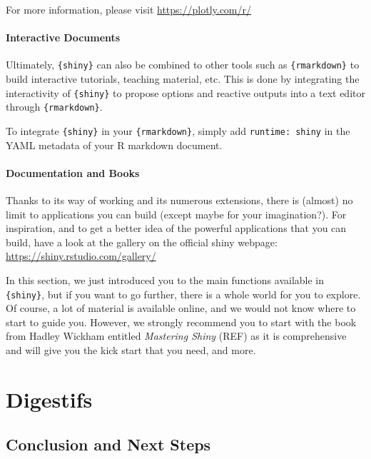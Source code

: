 \documentclass[
]{book}
\begin{document}
For more information, please visit \url{https://plotly.com/r/}

\hypertarget{interactive-documents}{%
\subsection{Interactive Documents}\label{interactive-documents}}

Ultimately, \texttt{\{shiny\}} can also be combined to other tools such as \texttt{\{rmarkdown\}} to build interactive tutorials, teaching material, etc. This is done by integrating the interactivity of \texttt{\{shiny\}} to propose options and reactive outputs into a text editor through \texttt{\{rmarkdown\}}.

To integrate \texttt{\{shiny\}} in your \texttt{\{rmarkdown\}}, simply add \texttt{runtime:\ shiny} in the YAML metadata of your R markdown document.

\hypertarget{documentation-and-books}{%
\subsection{Documentation and Books}\label{documentation-and-books}}

Thanks to its way of working and its numerous extensions, there is (almost) no limit to applications you can build (except maybe for your imagination?). For inspiration, and to get a better idea of the powerful applications that you can build, have a look at the gallery on the official shiny webpage:
\url{https://shiny.rstudio.com/gallery/}

In this section, we just introduced you to the main functions available in \texttt{\{shiny\}}, but if you want to go further, there is a whole world for you to explore. Of course, a lot of material is available online, and we would not know where to start to guide you. However, we strongly recommend you to start with the book from Hadley Wickham entitled \emph{Mastering Shiny} (REF) as it is comprehensive and will give you the kick start that you need, and more.

\hypertarget{part-digestifs}{%
\part*{Digestifs}\label{part-digestifs}}

\hypertarget{next-steps}{%
\chapter{Conclusion and Next Steps}\label{next-steps}}
\end{document}
